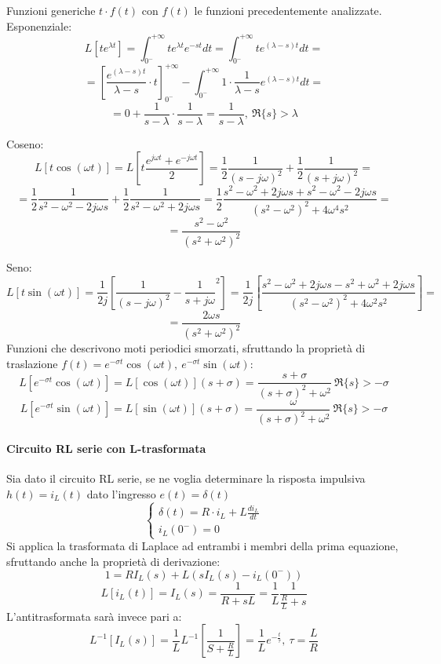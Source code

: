 
Funzioni generiche $t\cdot f(t)$ con $f(t)$ le funzioni precedentemente analizzate.
Esponenziale:
$$
L[te^{\lambda t}] = \int_{0^-}^{+\infty} t e^{\lambda t}e^{-s t} dt = \int_{0^-}^{+\infty}t e^{(\lambda -s)t}
dt = 
$$
$$
= \left[\frac{e^{(\lambda -s )t }}{\lambda-s}\cdot t\right]_{0^-}^{+\infty} - \int_{0^-}^{+\infty}1\cdot\frac{1}{\lambda -s}e^{(\lambda-s)t}dt = 
$$
$$
= 0 + \frac{1}{s-\lambda}\cdot\frac{1}{s-\lambda} = \frac{1}{s-\lambda} ,\ \Re\{s\} > \lambda
$$

Coseno:
$$
L[t\cos(\omega t)] = L\left[t \frac{e^{j\omega t}+e^{-j\omega t}}{2}\right] = \frac{1}{2}\frac{1}{(s-j\omega)^2} + \frac{1}{2}\frac{1}{(s+j\omega)^2} = 
$$
$$
= \frac{1}{2}\frac{1}{s^2-\omega^2-2j\omega s} + \frac{1}{2}\frac{1}{s^2-\omega^2+2j\omega s} =
\frac{1}{2}\frac{s^2-\omega^2+2j\omega s +s^2 -\omega^2 -2j\omega s}{(s^2-\omega^2)^2+4\omega^4s^2} =
$$
$$
= \frac{s^2-\omega^2}{(s^2+\omega^2)^2}
$$

Seno:
$$%
L[t\sin(\omega t)] = \frac{1}{2j} \left[\frac{1}{(s-j\omega)^2}-\frac{1}{s+j\omega}^2\right] =
\frac{1}{2j}\left[\frac{s^2-\omega^2+2j\omega s-s^2+\omega^2+2j\omega s}{(s^2-\omega^2)^2+4\omega^2s^2}\right] = 
$$
$$
= \frac{2\omega s}{(s^2+\omega^2)^2}
$$
Funzioni che descrivono moti periodici smorzati, sfruttando la proprietà di traslazione
$f(t) = e^{-\sigma t}\cos(\omega t),\  e^{-\sigma t}\sin(\omega t)$:
$$
L[e^{-\sigma t}\cos(\omega t)] = L[\cos(\omega t)](s+\sigma) = \frac{s+\sigma}{(s+\sigma)^2+\omega^2}\ \Re\{s\} > -\sigma
$$
$$
L[e^{-\sigma t}\sin(\omega t)] = L[\sin(\omega t)](s+\sigma) = \frac{\omega}{(s+\sigma)^2+\omega^2}\ \Re\{s\} > -\sigma
$$
\paragraph{Circuito RL serie con L-trasformata}
Sia dato il circuito RL serie, se ne voglia determinare la risposta impulsiva $h(t) = i_L(t)$ dato l'ingresso
$e(t) = \delta(t)$
$$
\begin{cases}
\delta(t) = R\cdot i_L + L\frac{di_L}{dt} \\
i_L(0^-) = 0
\end{cases}
$$
Si applica la trasformata di Laplace ad entrambi i membri della prima equazione, sfruttando anche
la proprietà di derivazione:
$$
1 = RI_L(s) + L(sI_L(s) - i_L(0^-))
$$
$$
L[i_L(t)] = I_L(s) = \frac{1}{R+sL} = \frac{1}{L}\frac{1}{\frac{R}{L}+s}
$$
L'antitrasformata sarà invece pari a:
$$
L^{-1}[I_L(s)] = \frac{1}{L} L^{-1}\left[\frac{1}{S+\frac{R}{L}}\right] = \frac{1}{L}e^{-\frac{t}{\tau}},\ 
\tau = \frac{L}{R}
$$

